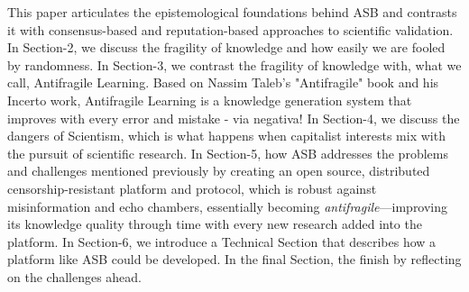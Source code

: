 This paper articulates the epistemological foundations behind ASB and contrasts it with consensus-based and reputation-based approaches to scientific validation. 
In Section-2, we discuss the fragility of knowledge and how easily we are fooled by randomness. 
In Section-3, we contrast the fragility of knowledge with, what we call, Antifragile Learning. Based on Nassim Taleb's "Antifragile" book and his Incerto work, Antifragile Learning is a knowledge generation system that improves with every error and mistake - via negativa!
In Section-4, we discuss the dangers of Scientism, which is what happens when capitalist interests mix with the pursuit of scientific research.
In Section-5, how ASB addresses the problems and challenges mentioned previously by creating an open source, distributed censorship-resistant platform and protocol, which is robust against misinformation and echo chambers, essentially becoming \emph{antifragile}---improving its knowledge quality through time with every new research added into the platform. 
In Section-6, we introduce a Technical Section that describes how a platform like ASB could be developed.
In the final Section, the finish by reflecting on the challenges ahead.